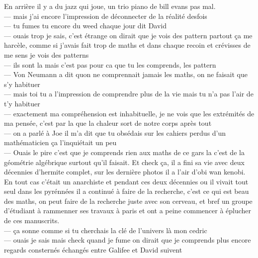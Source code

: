 \documentclass{article}
\begin{document}
En arrière il y a du jazz qui joue, un trio piano de bill evans pas mal.\\


--- mais j'ai encore l'impression de déconnecter de la réalité desfois\\
--- tu fumes tu encore du weed chaque jour dit David\\
--- ouais trop je sais, c'est étrange on dirait que je vois des pattern partout ça me harcèle,
comme si j'avais fait trop de maths et dans chaque recoin et crévisses de me sens je vois des patterns\\
--- ils sont la mais c'est pas pour ca que tu les comprends, les pattern \\
--- Von Neumann a dit quon ne comprennait jamais les maths, on ne faisait que s'y habituer\\
--- mais toi tu a l'impression de comprendre plus de la vie mais tu n'a pas l'air de t'y habituer\\
--- exactement ma compréhension est inhabituelle, je ne vois que les extrémités de ma pensée,
c'est par la que la chaleur sort de notre corps après tout\\


---  on a parlé  à Joe il m'a dit que tu obsédais sur les cahiers perdus d'un mathématicien
ça l'inquiétait un peu\\
--- Ouais le pire c'est que je comprends rien aux maths de ce gars la c'est de la géométrie algébrique
surtout qu'il faisait. Et check ça, il a fini sa vie avec deux décennies d'hermite complet, sur les
dernière photos il a l'air d'obi wan kenobi. En tout cas c'était un anarchiste et pendant ces
deux décennies ou il vivait tout seul dans les pyrénnées il a continué à faire de la recherche,
c'est ce qui est beau des maths, on peut faire de la recherche juste avec son cerveau, et bref
un groupe d'étudiant à rammenner ses travaux à paris et ont a peine commencer à
éplucher de ces manuscrits.\\
--- ça sonne comme si tu cherchais la clé de l'univers là mon cedric\\
--- ouais je sais mais check quand je fume on dirait que je comprends plus encore\\

regards consternés échangés entre Galifee et David suivent\\
\end{document}
